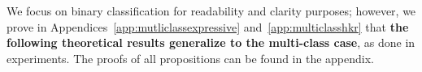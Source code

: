 We focus on binary classification for readability and clarity purposes; however, we prove in Appendices~\ref{app:mutliclassexpressive} and~\ref{app:multiclasshkr} that \textbf{the following theoretical results generalize to the multi-class case}, as done in experiments. The proofs of all propositions can be found in the appendix. %